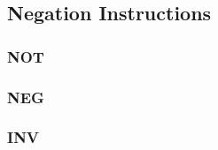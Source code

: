 \subsection{Negation Instructions}

\subsubsection{NOT }\label{sec:NOT}

\subsubsection{NEG }\label{sec:NEG}
 
\subsubsection{INV }\label{sec:INV}